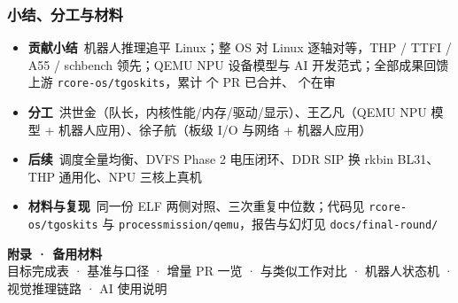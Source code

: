 \documentclass[aspectratio=169,11pt]{ctexbeamer}
\newcommand{\headline}[1]{{\sffamily\bfseries\color{teal}#1}}
\begin{document}
\begin{frame}
  \frametitle{小结、分工与材料}
  \begin{itemize}
    \item \headline{贡献小结}\ 机器人推理追平 Linux；整 OS 对 Linux 逐轴对等，THP / TTFI / A55 / schbench 领先；QEMU NPU 设备模型与 AI 开发范式；全部成果回馈上游 \texttt{rcore-os/tgoskits}，累计 \nPRMerged{} 个 PR 已合并、\nPRInflight{} 个在审
    \item \headline{分工}\ 洪世金（队长，内核性能/内存/驱动/显示）、王乙凡（QEMU NPU 模型 + 机器人应用）、徐子航（板级 I/O 与网络 + 机器人应用）
    \item \headline{后续}\ 调度全量均衡、DVFS Phase 2 电压闭环、DDR SIP 换 rkbin BL31、THP 通用化、NPU 三核上真机
    \item \headline{材料与复现}\ 同一份 ELF 两侧对照、三次重复中位数；代码见 \texttt{rcore-os/tgoskits} 与 \texttt{processmission/qemu}，报告与幻灯见 \texttt{docs/final-round/}
  \end{itemize}
  \vfill
\end{frame}

\begin{frame}[plain]
  \vfill\centering
  {\sffamily\bfseries\color{teal}\LARGE 附录 · 备用材料}\\[8pt]
  {\color{muted}\large 目标完成表 · 基准与口径 · 增量 PR 一览 · 与类似工作对比 · 机器人状态机 · 视觉推理链路 · AI 使用说明}
  \vfill
\end{frame}
\end{document}
